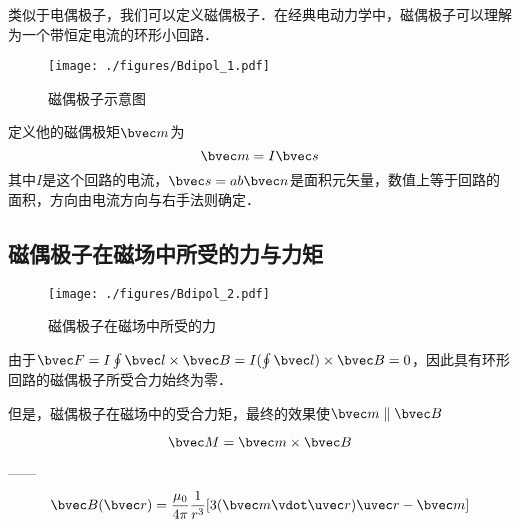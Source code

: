 
\begin{issues}
\issueDraft
\end{issues}
类似于电偶极子，我们可以定义磁偶极子．在经典电动力学中，磁偶极子可以理解为一个带恒定电流的环形小回路．
\begin{figure}[ht]
\centering
\texttt{[image: ./figures/Bdipol\_1.pdf]}
\caption{磁偶极子示意图} \label{Bdipol_fig1}
\end{figure}

定义他的磁偶极矩$\bvec m$为
\begin{equation}
\bvec m = I \bvec s
\end{equation}
其中$I$是这个回路的电流，$\bvec s = ab\bvec n$是面积元矢量，数值上等于回路的面积，方向由电流方向与右手法则确定．

\subsection{磁偶极子在磁场中所受的力与力矩}
\begin{figure}[ht]
\centering
\texttt{[image: ./figures/Bdipol\_2.pdf]}
\caption{磁偶极子在磁场中所受的力} \label{Bdipol_fig2}
\end{figure}
由于$\bvec F = I \oint \bvec l \times \bvec B = I (\oint \bvec l) \times \bvec B = 0$，因此具有环形回路的磁偶极子所受合力始终为零．

但是，磁偶极子在磁场中的受合力矩，最终的效果使$\bvec m \parallel \bvec B$

\begin{equation}
\bvec M = \bvec m \times \bvec B
\end{equation}

------
\begin{equation}
\bvec B(\bvec r) = \frac{\mu_0}{4\pi} \frac{1}{r^3} [3(\bvec m \vdot \uvec r) \uvec r - \bvec m]
\end{equation}
